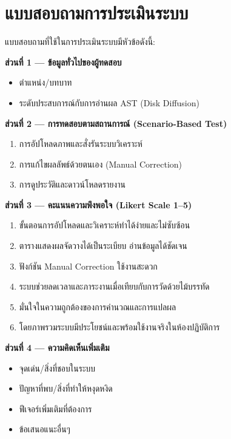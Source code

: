 \chapter{แบบสอบถามการประเมินระบบ}

แบบสอบถามที่ใช้ในการประเมินระบบมีหัวข้อดังนี้:

\textbf{ส่วนที่ 1 — ข้อมูลทั่วไปของผู้ทดสอบ}
\begin{itemize}
  \item ตำแหน่ง/บทบาท
  \item ระดับประสบการณ์กับการอ่านผล AST (Disk Diffusion)
\end{itemize}

\textbf{ส่วนที่ 2 — การทดสอบตามสถานการณ์ (Scenario-Based Test)}
\begin{enumerate}
  \item การอัปโหลดภาพและสั่งรันระบบวิเคราะห์
  \item การแก้ไขผลลัพธ์ด้วยตนเอง (Manual Correction)
  \item การดูประวัติและดาวน์โหลดรายงาน
\end{enumerate}

\textbf{ส่วนที่ 3 — คะแนนความพึงพอใจ (Likert Scale 1--5)}
\begin{enumerate}
  \item ขั้นตอนการอัปโหลดและวิเคราะห์ทำได้ง่ายและไม่ซับซ้อน
  \item ตารางแสดงผลจัดวางได้เป็นระเบียบ อ่านข้อมูลได้ชัดเจน
  \item ฟังก์ชัน Manual Correction ใช้งานสะดวก
  \item ระบบช่วยลดเวลาและภาระงานเมื่อเทียบกับการวัดด้วยไม้บรรทัด
  \item มั่นใจในความถูกต้องของการคำนวณและการแปลผล
  \item โดยภาพรวมระบบมีประโยชน์และพร้อมใช้งานจริงในห้องปฏิบัติการ
\end{enumerate}

\textbf{ส่วนที่ 4 — ความคิดเห็นเพิ่มเติม}
\begin{itemize}
  \item จุดเด่น/สิ่งที่ชอบในระบบ
  \item ปัญหาที่พบ/สิ่งที่ทำให้หงุดหงิด
  \item ฟีเจอร์เพิ่มเติมที่ต้องการ
  \item ข้อเสนอแนะอื่นๆ
\end{itemize}
